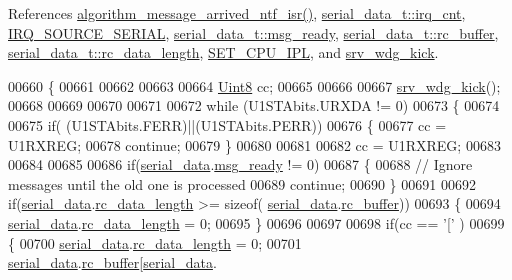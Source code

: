 References \hyperlink{a00038_source_l02104}{algorithm\+\_\+message\+\_\+arrived\+\_\+ntf\+\_\+isr()}, \hyperlink{a00030_source_l00054}{serial\+\_\+data\+\_\+t\+::irq\+\_\+cnt}, \hyperlink{a00021_source_l00058}{I\+R\+Q\+\_\+\+S\+O\+U\+R\+C\+E\+\_\+\+S\+E\+R\+I\+A\+L}, \hyperlink{a00030_source_l00035}{serial\+\_\+data\+\_\+t\+::msg\+\_\+ready}, \hyperlink{a00030_source_l00031}{serial\+\_\+data\+\_\+t\+::rc\+\_\+buffer}, \hyperlink{a00030_source_l00033}{serial\+\_\+data\+\_\+t\+::rc\+\_\+data\+\_\+length}, \hyperlink{a00015_source_l08162}{S\+E\+T\+\_\+\+C\+P\+U\+\_\+\+I\+P\+L}, and \hyperlink{a00067_source_l00028}{srv\+\_\+wdg\+\_\+kick}.


\begin{DoxyCode}
00660 \{
00661      
00662 
00663      
00664     \hyperlink{a00072_af84840501dec18061d18a68c162a8fa2}{Uint8} cc;
00665     
00666     
00667    \hyperlink{a00067_a710d148845397582739d170341f3d3d9}{srv\_wdg\_kick}();
00668    
00669 
00670 
00671    
00672   \textcolor{keywordflow}{while} (U1STAbits.URXDA != 0)
00673     \{
00674         
00675         \textcolor{keywordflow}{if}( (U1STAbits.FERR)||(U1STAbits.PERR))
00676         \{
00677             cc = U1RXREG;
00678             \textcolor{keywordflow}{continue};
00679         \}
00680 
00681      
00682         cc = U1RXREG;
00683     
00684       
00685 
00686         \textcolor{keywordflow}{if}(\hyperlink{a00030_a77d3b77ccd59a0065642bf1ac7887b9d}{serial\_data}.\hyperlink{a00030_ac0789a6c9ab7ccd13d6f04ae31496854}{msg\_ready} != 0)
00687         \{
00688             \textcolor{comment}{// Ignore messages until the old one is processed}
00689             \textcolor{keywordflow}{continue};
00690         \}
00691 
00692         \textcolor{keywordflow}{if}(\hyperlink{a00030_a77d3b77ccd59a0065642bf1ac7887b9d}{serial\_data}.\hyperlink{a00030_ab136d4fef2c523afd55b6ca74c46d7cc}{rc\_data\_length} >= \textcolor{keyword}{sizeof}(
      \hyperlink{a00030_a77d3b77ccd59a0065642bf1ac7887b9d}{serial\_data}.\hyperlink{a00030_ac734cb8be27f86bd99edc539434883a4}{rc\_buffer}))
00693         \{
00694             \hyperlink{a00030_a77d3b77ccd59a0065642bf1ac7887b9d}{serial\_data}.\hyperlink{a00030_ab136d4fef2c523afd55b6ca74c46d7cc}{rc\_data\_length} = 0;
00695         \}
00696 
00697    
00698         \textcolor{keywordflow}{if}(cc == \textcolor{charliteral}{'['} )
00699         \{
00700             \hyperlink{a00030_a77d3b77ccd59a0065642bf1ac7887b9d}{serial\_data}.\hyperlink{a00030_ab136d4fef2c523afd55b6ca74c46d7cc}{rc\_data\_length} = 0;
00701             \hyperlink{a00030_a77d3b77ccd59a0065642bf1ac7887b9d}{serial\_data}.\hyperlink{a00030_ac734cb8be27f86bd99edc539434883a4}{rc\_buffer}[\hyperlink{a00030_a77d3b77ccd59a0065642bf1ac7887b9d}{serial\_data}.

\end{DoxyCode}
